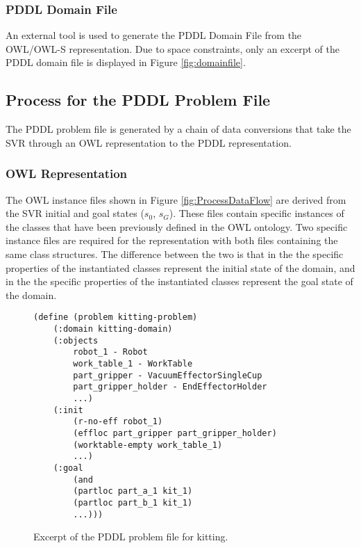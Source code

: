 \subsubsection{PDDL Domain File}
An external tool is used to generate the PDDL Domain File from the OWL/OWL-S representation. Due to space constraints, only an excerpt of the PDDL domain file is displayed in Figure \ref{fig:domainfile}.

\subsection{Process for the PDDL Problem File}
\label{subsect:PDDL_Problem_File}
The PDDL problem file is generated by a chain of data conversions that take the SVR through an OWL representation to the PDDL representation.
\subsubsection{OWL Representation}
The OWL instance files shown in Figure \ref{fig:ProcessDataFlow} are derived from the SVR initial and goal states ($s_0$, $s_G$). These files contain
specific instances of the classes that have been previously defined in the OWL ontology. Two specific instance files are required for the representation with
both files containing the same class structures. The difference between the two is that in the  the specific properties of the instantiated
classes represent the initial state of the domain, and in the  the specific properties of the instantiated classes represent the goal state
of the domain.
\begin{figure}[h!]
\centering
\begin{minipage}{.5\paperwidth}
\begin{mylisting}
\begin{Verbatim}[commandchars=\\\{\},commandchars=+\[\],fontsize=\scriptsize,numbersep=3pt]
(define (problem kitting-problem)
    (:domain kitting-domain)
    (:objects
        robot_1 - Robot
        work_table_1 - WorkTable
        part_gripper - VacuumEffectorSingleCup
        part_gripper_holder - EndEffectorHolder
        ...)
    (:init
        (r-no-eff robot_1)			
        (effloc part_gripper part_gripper_holder)
        (worktable-empty work_table_1)
        ...)
    (:goal
        (and
        (partloc part_a_1 kit_1)
        (partloc part_b_1 kit_1)
        ...)))
\end{Verbatim}
\end{mylisting}
\end{minipage}
\caption{Excerpt of the PDDL problem file for kitting.\label{fig:problemfile}}

\end{figure}

